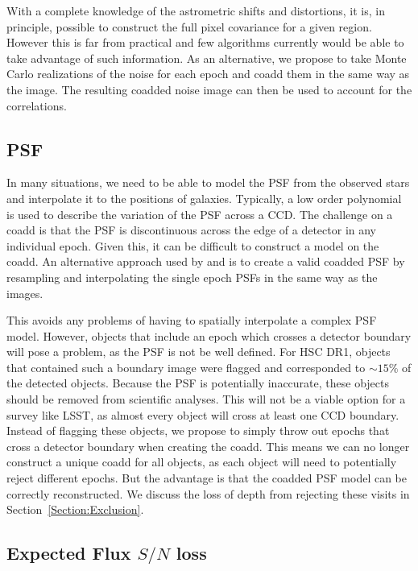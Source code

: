 \documentclass[fleqn,useAMS,usenatbib]{mnras}
\begin{document}
With a complete knowledge of the astrometric shifts and distortions, it is, in 
principle, possible to construct the full pixel covariance for a given region.  
However this is far from practical and few algorithms currently would be able 
to take advantage of such information.  As an alternative, we propose to take 
Monte Carlo realizations of the noise for each epoch and coadd them in the same 
way as the image.  The resulting coadded noise image can then be used to 
account for the correlations. 

\subsection{PSF}
\label{Subsection:PSF}
In many situations, we need to be able to model the PSF from the observed stars 
and interpolate it to the positions of galaxies.  Typically, a low order 
polynomial is used to describe the variation of the PSF across a CCD.  The 
challenge on a coadd is that the PSF is discontinuous across the edge 
of a detector in any individual epoch.  Given this, it can be difficult to construct a 
model on the coadd.  An alternative approach used by 
\cite{Jee2016} and \cite{Bosch2018} is to create a valid coadded PSF by resampling 
and interpolating the single epoch PSFs in the same way as the images.

This avoids any problems of having to spatially interpolate a 
complex PSF model.  However, objects that include an epoch which crosses a 
detector boundary will pose a problem, as the PSF is not be well defined.  For 
HSC DR1, objects that contained such a boundary image were flagged and 
corresponded to $\sim15\%$ of the detected objects.  Because the PSF is 
potentially inaccurate, these objects should be removed from scientific 
analyses.  This will not be a viable option for a survey like LSST, as almost 
every object will cross at least one CCD boundary.  Instead of flagging these 
objects, we propose to simply throw out epochs that cross a detector boundary 
when creating the coadd.  This means we can no longer construct a unique coadd 
for all objects, as each object will need to potentially reject different 
epochs.  But the advantage is that the coadded PSF model can be correctly 
reconstructed.  We discuss the loss of depth from rejecting these visits in 
Section~\ref{Section:Exclusion}.

\subsection{Expected Flux $S/N$ loss}
\label{Subsection:FluxSN}
\end{document}
